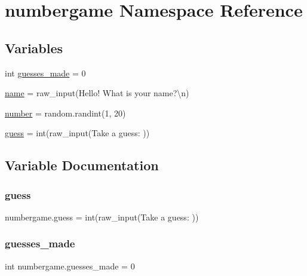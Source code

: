 \hypertarget{namespacenumbergame}{}\section{numbergame Namespace Reference}
\label{namespacenumbergame}
\subsection*{Variables}
\begin{DoxyCompactItemize}
\item 
int \mbox{\hyperlink{namespacenumbergame_a51327e57a6de3a6381b175d395a9d263}{guesses\+\_\+made}} = 0
\item 
\mbox{\hyperlink{namespacenumbergame_a614fde7863ff2bef77f03070e684fecc}{name}} = raw\+\_\+input(\textquotesingle{}Hello! What is your name?\textbackslash{}n\textquotesingle{})
\item 
\mbox{\hyperlink{namespacenumbergame_a7bd192c0abfd74e913298880715e10e4}{number}} = random.\+randint(1, 20)
\item 
\mbox{\hyperlink{namespacenumbergame_afdb9108595f2e9597b8c980ef88e33f9}{guess}} = int(raw\+\_\+input(\textquotesingle{}Take a guess\+: \textquotesingle{}))
\end{DoxyCompactItemize}


\subsection{Variable Documentation}
\mbox{\label{namespacenumbergame_afdb9108595f2e9597b8c980ef88e33f9}} 
\subsubsection{\texorpdfstring{guess}{guess}}
{\footnotesize\ttfamily numbergame.\+guess = int(raw\+\_\+input(\textquotesingle{}Take a guess\+: \textquotesingle{}))}

\mbox{\label{namespacenumbergame_a51327e57a6de3a6381b175d395a9d263}} 
\subsubsection{\texorpdfstring{guesses\+\_\+made}{guesses\_made}}
{\footnotesize\ttfamily int numbergame.\+guesses\+\_\+made = 0}

